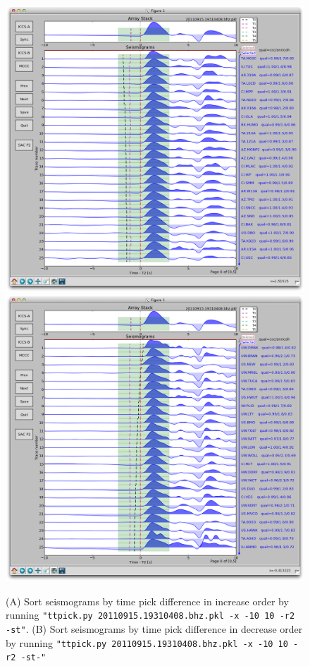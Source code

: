 \documentclass[12pt, titlepage]{article}
\begin{document}
\begin{figure}[!h]
    \centering
    \includegraphics[width = 0.494 \textwidth]{figs/snapshots/ttpick-r2-st-decrease.png}
    \includegraphics[width = 0.494 \textwidth]{figs/snapshots/ttpick-r2-st-increase.png}
    \caption{
    (A) Sort seismograms by time pick difference in increase order by running \texttt{"ttpick.py 20110915.19310408.bhz.pkl -x -10 10 -r2 -st"}. (B) Sort seismograms by time pick difference in decrease order by running \texttt{"ttpick.py 20110915.19310408.bhz.pkl -x -10 10 -r2 -st-"}
    }
    \label{fig:ttpick3}
\end{figure}
\end{document}

